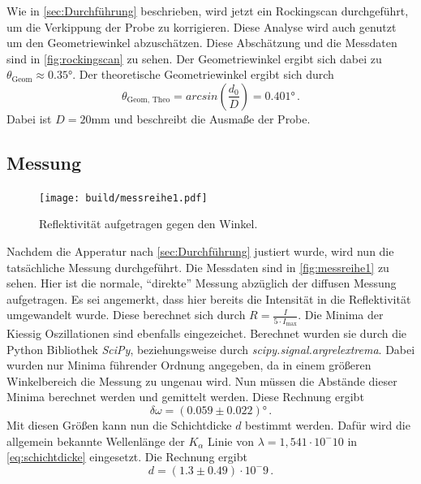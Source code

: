 Wie in \autoref{sec:Durchführung} beschrieben, wird jetzt ein Rockingscan durchgeführt, um die Verkippung der Probe zu korrigieren.
Diese Analyse wird auch genutzt um den Geometriewinkel abzuschätzen.
Diese Abschätzung und die Messdaten sind in \autoref{fig:rockingscan} zu sehen.
Der Geometriewinkel ergibt sich dabei zu $\theta_\text{Geom} \approx 0.35 °$.
Der theoretische Geometriewinkel ergibt sich durch 
\begin{equation*}
    \theta_\text{Geom, Theo} = arcsin\left(\frac{d_0}{D}\right) = 0.401 \unit\degree \, .
\end{equation*}
Dabei ist $D = 20 \unit{\milli\meter}$ und beschreibt die Ausmaße der Probe.

\subsection{Messung}

\begin{figure}
    \centering
    \texttt{[image: build/messreihe1.pdf]}
    \caption{Reflektivität aufgetragen gegen den Winkel.}
    \label{fig:messreihe1}
\end{figure}

Nachdem die Apperatur nach \autoref{sec:Durchführung} justiert wurde, wird nun die tatsächliche Messung durchgeführt.
Die Messdaten sind in \autoref{fig:messreihe1} zu sehen.
Hier ist die normale, \enquote{direkte} Messung abzüglich der diffusen Messung aufgetragen.
Es sei angemerkt, dass hier bereits die Intensität in die Reflektivität umgewandelt wurde.
Diese berechnet sich durch $R = \frac{I}{ 5 \cdot I_\text{max}}$.
Die Minima der Kiessig Oszillationen sind ebenfalls eingezeichet.
Berechnet wurden sie durch die Python Bibliothek \textit{SciPy}, beziehungsweise durch \textit{scipy.signal.argrelextrema}.
Dabei wurden nur Minima führender Ordnung angegeben, da in einem größeren Winkelbereich die Messung zu ungenau wird.
Nun müssen die Abstände dieser Minima berechnet werden und gemittelt werden.
Diese Rechnung ergibt
\begin{equation*}
    \delta \omega = (0.059 \pm 0.022) \unit\degree \, .
\end{equation*}
Mit diesen Größen kann nun die Schichtdicke $d$ bestimmt werden.
Dafür wird die allgemein bekannte Wellenlänge der $K_\alpha$ Linie von $\lambda = 1, 541 \cdot 10^-10$ in \autoref{eq:schichtdicke} eingesetzt.
Die Rechnung ergibt
\begin{equation*}
    d = (1.3 \pm 0.49) \cdot 10^-9 \, .
\end{equation*}